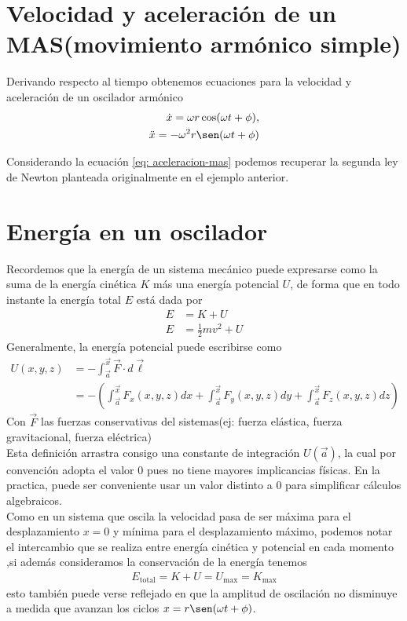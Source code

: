\documentclass[12pt]{article}
\begin{document}
\section{Velocidad y aceleración de un MAS(movimiento armónico simple)}
Derivando respecto al tiempo obtenemos ecuaciones para la velocidad y aceleración de un oscilador armónico
\begin{align}
    \dot{x} = \omega r \cos(\omega t + \phi), \label{eq : velocidad-mas} \\
    \ddot{x} = -\omega^{2} r \sen(\omega t + \phi) \label{eq: aceleracion-mas}
\end{align}

Considerando la ecuación \eqref{eq: aceleracion-mas} podemos recuperar la segunda ley de Newton planteada originalmente en el ejemplo anterior.

\section{Energía en un oscilador}

Recordemos que la energía de un sistema mecánico puede expresarse como la suma de la energía cinética \(K\) más una energía potencial \(U\), de forma que en todo instante la energía total \(E\) está dada por 
\begin{align}
    E &= K + U \nonumber\\
    E &= \frac{1}{2}m v^{2} + U
\end{align}
Generalmente, la energía potencial puede escribirse como
\begin{align*}
    U(x,y,z) &= - \int_{\vec{a}}^{\vec{x}} \vec{F} \cdot d\vec{\ell} \\
    &= -\left(\int_{\vec{a}}^{\vec{x}} F_x(x,y,z) dx + \int_{\vec{a}}^{\vec{x}} F_y(x,y,z) dy + \int_{\vec{a}}^{\vec{x}} F_z(x,y,z) dz\right)
\end{align*}
Con \(\vec{F}\) las fuerzas conservativas del sistemas(ej: fuerza elástica, fuerza gravitacional, fuerza eléctrica)\\

Esta definición arrastra consigo una constante de integración \(U(\vec{a})\), la cual por convención adopta el valor 0 pues no tiene mayores implicancias físicas. En la practica, puede ser conveniente usar un valor distinto a 0 para simplificar cálculos algebraicos.\\


Como en un sistema que oscila la velocidad pasa de ser máxima para el desplazamiento \(x= 0\) y mínima para el desplazamiento máximo, podemos notar el intercambio que se realiza entre energía cinética y potencial en cada momento ,si además consideramos la conservación de la energía tenemos
\begin{align*}
    E_{\text{total}} = K + U = U_{\text{max}} = K_{ \text{max}} 
\end{align*}
esto también puede verse reflejado en que la amplitud de oscilación no disminuye a medida que avanzan los ciclos \( x = r\sen(\omega t + \phi)\).
\end{document}
